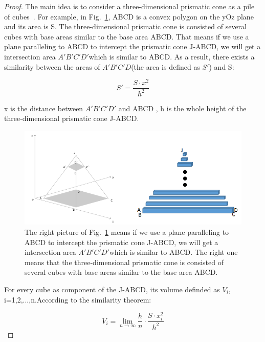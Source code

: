 \documentclass[runningheads]{llncs}
\begin{document}
\begin{proof}
The main idea is to consider a three-dimensional prismatic cone as a pile of cubes~\cite{ref_book1}. For example, in Fig.~\ref{FigR1_1}, ABCD is a convex polygon on the yOz plane and its area is S. The three-dimensional prismatic cone is consisted of several cubes with base areas similar to the base area ABCD. That means if we use a plane paralleling to ABCD to intercept the prismatic cone J-ABCD, we will get a intersection area ${A}'{B}'{C}'{D}'$which is similar to ABCD. As a result, there exists a similarity between the areas of ${A}'{B}'{C}'{D}$(the area is defined as ${S}'$) and S:

\begin{equation}\label{A1}
{S}'=\frac{S\cdot x^{2}}{h^{2}} 
\end{equation}

x is the distance between ${A}'{B}'{C}'{D}'$ and ABCD , h is the whole height of the three-dimensional prismatic cone J-ABCD.

\begin{figure}
\includegraphics[width=\textwidth]{../Fig/FigR1_1.png}
\caption{The right picture of Fig.~\ref{FigR1_1} means if we use a plane paralleling to ABCD to intercept the prismatic cone J-ABCD, we will get a intersection area ${A}'{B}'{C}'{D}'$which is similar to ABCD. The right one means that the three-dimensional prismatic cone is consisted of several cubes with base areas similar to the base area ABCD.} \label{FigR1_1}
\end{figure}

For every cube as component of the J-ABCD, its volume definded as $V_{i}$, i=1,2,...,n.According to the similarity theorem: 

\begin{equation}\label{A2}
V_{i}=\lim \limits_{n \to \infty}\frac{h}{n}\cdot \frac{S\cdot x_{i}^{2}}{h^{2}}
\end{equation}


\end{proof}
\end{document}
